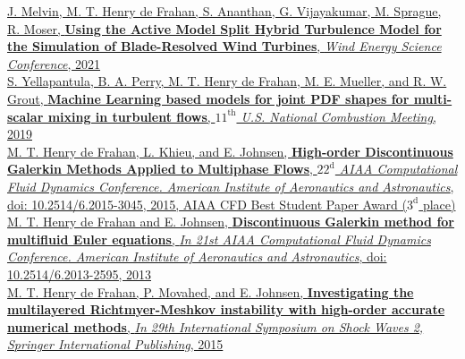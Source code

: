 \documentclass[11pt,letterpaper]{article}
\newcommand{\raisedrule}[2][0em]{\leaders\hbox{\rule[#1]{1pt}{#2}}\hfill}
\newcommand*{\sectionfont}{\Large\sffamily\mdseries\upshape}
\begin{document}
\href{}{J. Melvin, M. T. Henry de Frahan, S. Ananthan, G. Vijayakumar, M. Sprague, R. Moser, \textbf{Using the Active Model Split Hybrid Turbulence Model for the Simulation of Blade-Resolved Wind Turbines}, \textit{Wind Energy Science Conference}, 2021}\\[2ex]%
\href{}{S. Yellapantula, B. A. Perry, M. T. Henry de Frahan, M. E. Mueller, and R. W. Grout, \textbf{Machine Learning based models for joint PDF shapes for multi-scalar mixing in turbulent flows}, \textit{$11^{\text{th}}$ U.S. National Combustion Meeting}, 2019}\\[2ex]%
\href{http://arc.aiaa.org/doi/pdf/10.2514/6.2015-3045}{M. T. Henry de Frahan, L. Khieu, and E. Johnsen, \textbf{High-order Discontinuous Galerkin Methods Applied to Multiphase Flows}, \textit{$22^{\text{d}}$ AIAA Computational Fluid Dynamics Conference. American Institute of Aeronautics and Astronautics}, doi: 10.2514/6.2015-3045, 2015, AIAA CFD Best Student Paper Award ($3^{\text{d}}$ place)}\\[2ex]%
\href{http://arc.aiaa.org/doi/pdf/10.2514/6.2013-2595}{M. T. Henry de Frahan and E. Johnsen, \textbf{Discontinuous Galerkin method for multifluid Euler equations}, \textit{In 21st AIAA Computational Fluid Dynamics Conference. American Institute of Aeronautics and Astronautics}, doi: 10.2514/6.2013-2595, 2013}\\[2ex]%
\href{https://books.google.com/books?id=6GgnCgAAQBAJ&pg=PA1095&lr=&source=gbs_selected_pages&cad=2#v=onepage&q&f=false}{M. T. Henry de Frahan, P. Movahed, and E. Johnsen, \textbf{Investigating the multilayered Richtmyer-Meshkov instability with high-order accurate numerical methods}, \textit{In 29th International Symposium on Shock Waves 2, Springer International Publishing}, 2015}\\[3ex]%
%
%
%
%
\end{document}
